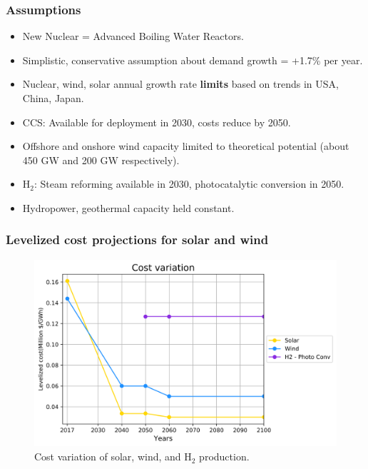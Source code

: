 \begin{frame}
  \frametitle{Assumptions}

  \begin{itemize}
  
  \item New Nuclear = Advanced Boiling Water Reactors.
  
  \item Simplistic, conservative assumption about demand growth = +1.7\% per year.
  
  \item Nuclear, wind, solar annual growth rate \textbf{limits} based on trends in USA, China, Japan.
  
  \item CCS: Available for deployment in 2030, costs reduce by 2050.
  
  \item Offshore and onshore wind capacity limited to theoretical potential (about 450 GW and 200 GW respectively).
  
  \item H$_2$: Steam reforming available in 2030, photocatalytic conversion in 2050.
  
  \item Hydropower, geothermal capacity held constant.
  
  \end{itemize}

\end{frame}


\begin{frame}
  \frametitle{Levelized cost projections for solar and wind}
  \begin{figure}[htbp!]
    \begin{center}
      \includegraphics[scale=0.6]{./images/cost}
    \end{center}
          \caption{Cost variation of solar, wind, and H$_2$ production.}
    \label{cost}
  \end{figure}
\end{frame}

